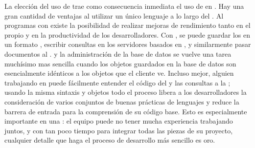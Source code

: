 La elección del uso de \nodejsNAME trae como consecuencia inmediata el uso de \javaScriptNAME en \serverSideAS. Hay una gran cantidad de ventajas al utilizar un único lenguaje a lo largo del \stackAS. Al programas con \javaScriptNAME existe la posibilidad de realizar mejoras de rendimiento tanto en el propio \softwarePC y en la productividad de los desarrolladores. Con \mongodbNAME, se puede guardar los \documentsDB en un formato \jsonLikeCPT, escribir consultas \jsonNAME en los servidores basados en \nodejsNAME, y similarmente pasar documentos \jsonNAME al \frontEndAS. \debuggingPL y la administración de la base de datos se vuelve una tarea muchísimo mas sencilla cuando los objetos guardados en la base de datos son esencialmente idénticos a los objetos que el cliente \javaScriptNAME ve. Incluso mejor, alguien trabajando en \clientSideAS puede fácilmente entender el código del \serverSideAS y las consultas a la \dataBaseDB; usando la misma sintaxis y objetos todo el proceso libera a los desarrolladores la consideración de varios conjuntos de buenas prácticas de lenguajes y reduce la barrera de entrada para la comprensión de su código base. Esto es especialmente importante en una \hackathonCPT: el equipo puede no tener mucha experiencia trabajando juntos, y con tan poco tiempo para integrar todas las piezas de su proyecto, cualquier detalle que haga el proceso de desarrollo más sencillo es oro.


